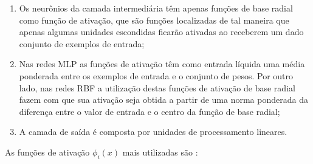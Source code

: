 \begin{enumerate}
\item Os neurônios da camada intermediária têm apenas funções de base radial como função de ativação, que são funções localizadas de tal maneira que apenas algumas unidades escondidas ficarão ativadas ao receberem um dado conjunto de exemplos de entrada;
\item Nas redes MLP as funções de ativação têm como entrada líquida uma média ponderada entre os exemplos de entrada e o conjunto de pesos. Por outro lado, nas redes RBF a utilização destas funções de ativação de base radial fazem com que sua ativação seja obtida a partir de uma norma ponderada da diferença entre o valor de entrada e o centro da função de base radial;
\item A camada de saída é composta por unidades de processamento lineares.
\end{enumerate}

As funções de ativação $\phi_i(x)$ \label{symbol:funcaoativacaoRBF} mais utilizadas são \cite{valenca2005aplicando} \cite{engelbrecht2007computational}:

